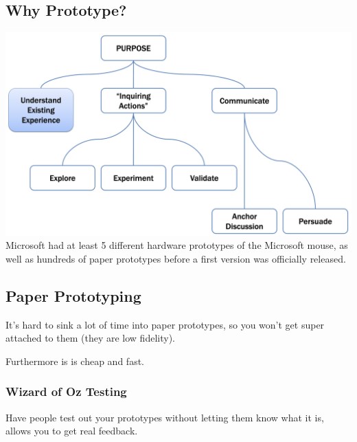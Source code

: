 \subsection{Why Prototype?}
\includegraphics[scale=0.15]{lectures/wk5/img/why_prototype.png}\\
Microsoft had at least 5 different hardware prototypes of the Microsoft mouse, as well as hundreds of paper prototypes before a first version was officially released.

\subsection{Paper Prototyping}
It's hard to sink a lot of time into paper prototypes, so you won't get super attached to them (they are low fidelity).

Furthermore is is cheap and fast.

\subsubsection{Wizard of Oz Testing}
Have people test out your prototypes without letting them know what it is, allows you to get real feedback.

